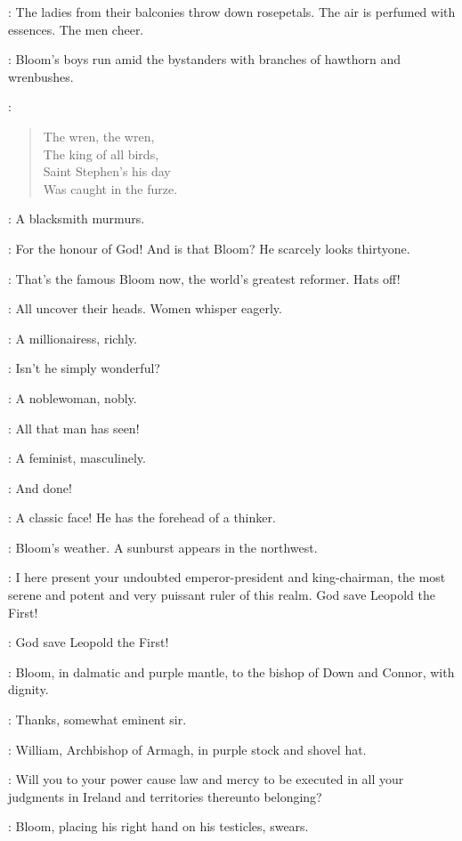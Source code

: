 :
The ladies from their balconies throw down rosepetals.
The air is perfumed with essences.
The men cheer.

:
Bloom's boys run amid the bystanders with branches of hawthorn and wrenbushes.

\BloomsBoys:
\begin{verse}
    The wren, the wren,\\
    The king of all birds,\\
    Saint Stephen's his day\\
    Was caught in the furze.
\end{verse}

:
A blacksmith murmurs.

\Blacksmith:
For the honour of God!
And is that Bloom?
He scarcely looks thirtyone.

\Flagger[1]:
That's the famous Bloom now, the world's greatest reformer.
Hats off!

:
All uncover their heads.
Women whisper eagerly.

:
A millionairess, richly.

\Millionairess:
Isn't he simply wonderful?

:
A noblewoman, nobly.

\Noblewoman:
All that man has seen!

:
A feminist, masculinely.

\Feminist:
And done!

\Bellhanger[2]:
A classic face!
He has the forehead of a thinker.

:
Bloom's weather.
A sunburst appears in the northwest.

\DownConnor[2]:
I here present your undoubted emperor-president and king-chairman,
the most serene and potent and very puissant ruler of this realm.
God save Leopold the First!

\All:
God save Leopold the First!

:
Bloom, in dalmatic and purple mantle,
to the bishop of Down and Connor, with dignity.

\Bloom:
Thanks, somewhat eminent sir.

:
William, Archbishop of Armagh, in purple stock and shovel hat.

\WillArmagh:
Will you to your power cause law and mercy to be executed
in all your judgments in Ireland and territories thereunto belonging?

:
Bloom, placing his right hand on his testicles, swears.

